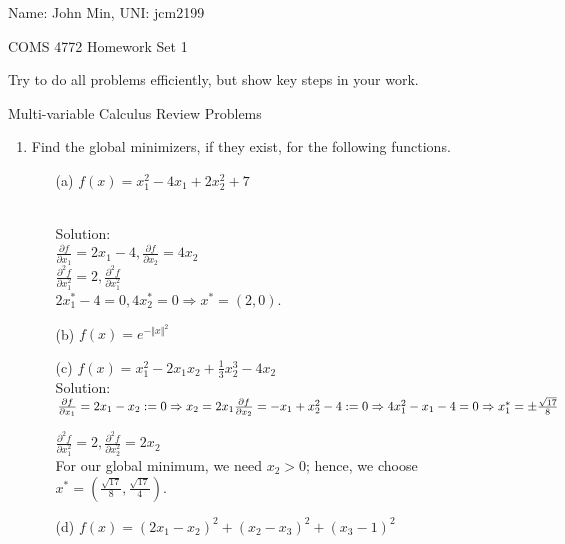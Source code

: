 \documentclass[12pt]{amsart}
\newcommand{\norm}[1]{\Vert #1 \Vert}
\begin{document}
{\Large Name: John Min, \Large UNI: jcm2199}  \\
\begin{center}
\Large COMS 4772 \hskip 2in Homework Set 1
\end{center}
\bigskip


Try to do all problems efficiently, but show key steps in your work. 

\noindent
{\sf Multi-variable Calculus Review Problems}

\begin{enumerate}
\item
Find the global minimizers, if they exist, for the following functions.
\begin{enumerate}
\item[(a)] $f(x)=x_1^2-4x_1+2x_2^2+7$

\noindent \\ 
\noindent
Solution: \\
$\frac{\partial f}{\partial x_1} = 2 x_1 - 4, \frac{\partial f}{\partial x_2} = 4 x_2$ \\
$\frac{\partial^2 f}{\partial x_1^2} = 2, \frac{\partial^2 f}{\partial x_1^2}$ \\
$ 2x_1^* - 4 = 0, 4x_2^* = 0 \Rightarrow x^* = (2,0)$. \\


\item[(b)] $f(x)=e^{-\norm{x}^2}$
\item[(c)] $f(x)=x_1^2-2x_1x_2+\frac{1}{3}x_2^3-4x_2$ \\

\noindent
Solution:\\
$\frac{\partial f}{\partial x_1} = 2x_1 - x_2 := 0 \Rightarrow x_2 = 2x_1 \\
\frac{\partial f}{\partial x_2} = -x_1 + x_2^2 - 4 := 0 \Rightarrow 4x_1^2 - x_1 - 4 = 0 \Rightarrow x_1^* = \pm \frac{\sqrt{17}}{8}$

$\frac{\partial^2 f}{\partial x_1^2} = 2, \frac{\partial^2 f}{\partial x_2^2} = 2x_2$ \\
\noindent
For our global minimum, we need $x_2 > 0$; hence, we choose $x^* = (\frac{\sqrt{17}}{8}, \frac{\sqrt{17}}{4})$.\\

\item[(d)] $f(x)=(2x_1-x_2)^2+(x_2-x_3)^2+(x_3-1)^2$\\


\end{enumerate}
\end{enumerate}
\end{document}
